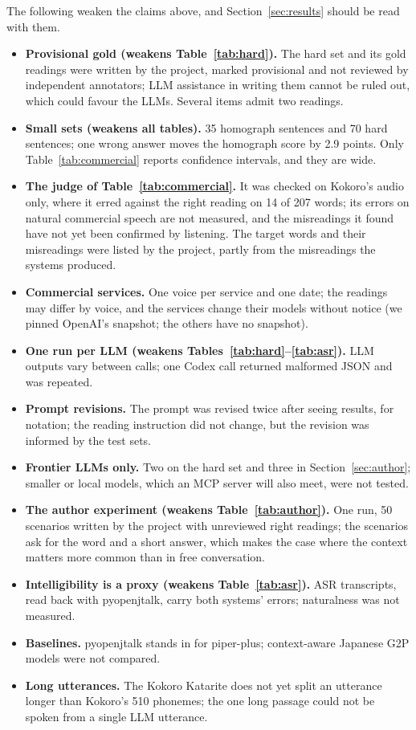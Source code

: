 \documentclass[11pt,a4paper]{article}
\begin{document}
The following weaken the claims above, and Section~\ref{sec:results} should be read with them.
\begin{itemize}
  \item \textbf{Provisional gold (weakens Table~\ref{tab:hard}).} The hard set and its gold readings were written by
  the project, marked provisional and not reviewed by independent annotators; LLM assistance in writing them cannot be
  ruled out, which could favour the LLMs. Several items admit two readings.
  \item \textbf{Small sets (weakens all tables).} 35 homograph sentences and 70 hard sentences; one wrong answer moves
  the homograph score by 2.9 points. Only Table~\ref{tab:commercial} reports confidence intervals, and they are wide.
  \item \textbf{The judge of Table~\ref{tab:commercial}.} It was checked on Kokoro's audio only, where it erred against
  the right reading on 14 of 207 words; its errors on natural commercial speech are not measured, and the misreadings it
  found have not yet been confirmed by listening. The target words and their misreadings were listed by the project,
  partly from the misreadings the systems produced.
  \item \textbf{Commercial services.} One voice per service and one date; the readings may differ by voice, and the
  services change their models without notice (we pinned OpenAI's snapshot; the others have no snapshot).
  \item \textbf{One run per LLM (weakens Tables~\ref{tab:hard}--\ref{tab:asr}).} LLM outputs vary between calls; one
  Codex call returned malformed JSON and was repeated.
  \item \textbf{Prompt revisions.} The prompt was revised twice after seeing results, for notation; the reading
  instruction did not change, but the revision was informed by the test sets.
  \item \textbf{Frontier LLMs only.} Two on the hard set and three in Section~\ref{sec:author}; smaller or local models,
  which an MCP server will also meet, were not tested.
  \item \textbf{The author experiment (weakens Table~\ref{tab:author}).} One run, 50 scenarios written by the project
  with unreviewed right readings; the scenarios ask for the word and a short answer, which makes the case where the
  context matters more common than in free conversation.
  \item \textbf{Intelligibility is a proxy (weakens Table~\ref{tab:asr}).} ASR transcripts, read back with pyopenjtalk,
  carry both systems' errors; naturalness was not measured.
  \item \textbf{Baselines.} pyopenjtalk stands in for piper-plus; context-aware Japanese G2P models were not compared.
  \item \textbf{Long utterances.} The Kokoro Katarite does not yet split an utterance longer than Kokoro's 510 phonemes;
  the one long passage could not be spoken from a single LLM utterance.
\end{itemize}
\end{document}
